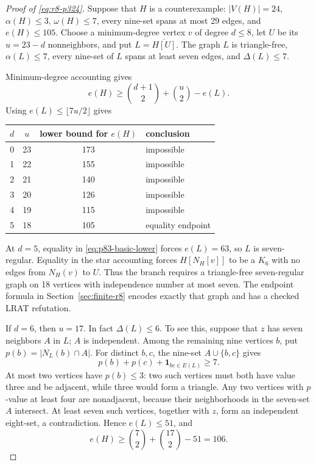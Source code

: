 \documentclass[11pt,reqno,a4paper]{amsart}
\theoremstyle{definition}
\theoremstyle{remark}
\newcommand{\comp}[1]{\overline{#1}}
\begin{document}
\begin{proof}[Proof of \eqref{eq:r8-p324}]
Suppose that $H$ is a counterexample: $|V(H)|=24$,
$\alpha(H)\leq3$, $\omega(H)\leq7$, every nine-set spans at most 29
edges, and $e(H)\leq105$. Choose a minimum-degree vertex $v$ of degree
$d\leq8$, let $U$ be its $u=23-d$ nonneighbors, and put
$L=\comp{H[U]}$. The graph $L$ is triangle-free,
$\alpha(L)\leq7$, every nine-set of $L$ spans at least seven edges,
and $\Delta(L)\leq7$.

Minimum-degree accounting gives
\begin{equation}\label{eq:p83-basic-lower}
 e(H)\geq\binom{d+1}{2}+\binom u2-e(L).
\end{equation}
Using $e(L)\leq\lfloor7u/2\rfloor$ gives
\begin{center}
\begin{tabular}{c@{\quad}c@{\quad}c@{\quad}l}
\toprule
$d$&$u$&lower bound for $e(H)$&conclusion\\
\midrule
0&23&173&impossible\\
1&22&155&impossible\\
2&21&140&impossible\\
3&20&126&impossible\\
4&19&115&impossible\\
5&18&105&equality endpoint\\
\bottomrule
\end{tabular}
\end{center}

At $d=5$, equality in \eqref{eq:p83-basic-lower} forces
$e(L)=63$, so $L$ is seven-regular. Equality in the star accounting
forces $H[N_H[v]]$ to be a $K_6$ with no edges from $N_H(v)$ to $U$.
Thus the branch requires a triangle-free seven-regular graph on 18
vertices with independence number at most seven. The endpoint formula in
Section~\ref{sec:finite-r8} encodes exactly that graph and has a checked
LRAT refutation.

If $d=6$, then $u=17$. In fact $\Delta(L)\leq6$. To see this, suppose
that $z$ has seven neighbors $A$ in $L$; $A$ is independent. Among the
remaining nine vertices $b$, put $p(b)=|N_L(b)\cap A|$. For distinct
$b,c$, the nine-set $A\cup\{b,c\}$ gives
\[
 p(b)+p(c)+\mathbf1_{bc\in E(L)}\geq7.
\]
At most two vertices have $p(b)\leq3$: two such vertices must both have
value three and be adjacent, while three would form a triangle. Any two
vertices with $p$-value at least four are nonadjacent, because their
neighborhoods in the seven-set $A$ intersect. At least seven such
vertices, together with $z$, form an independent eight-set, a
contradiction. Hence $e(L)\leq51$, and
\[
 e(H)\geq\binom72+\binom{17}{2}-51=106.
\]


\end{proof}
\end{document}
